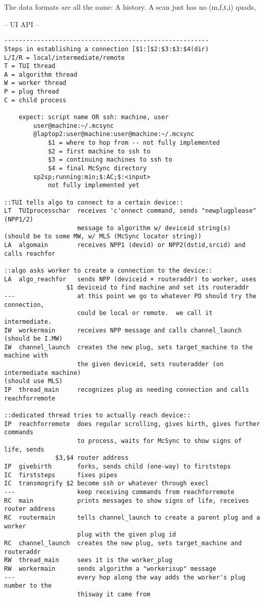 \documentclass{book}
\begin{document}
The data formats are all the same:  A history.  A scan just has no (m,f,t,i) quads,

-- UI API --

\begin{verbatim}
--------------------------------------------------------
Steps in establishing a connection [$1:]$2:$3:$3:$4(dir)
L/I/R = local/intermediate/remote
T = TUI thread
A = algorithm thread
W = worker thread
P = plug thread
C = child process

    expect: script name OR ssh: machine, user
        user@machine:~/.mcsync
        @laptop2:user@machine:user@machine:~/.mcsync
            $1 = where to hop from -- not fully implemented
            $2 = first machine to ssh to
            $3 = continuing machines to ssh to
            $4 = final McSync directory
        sp2sp;running:min;$:AC;$:<input>
            not fully implemented yet

::TUI tells algo to connect to a certain device::
LT  TUIprocesschar  receives 'c'onnect command, sends "newplugplease" (NPP1/2)
                    message to algorithm w/ deviceid string(s)
(should be to some MW, w/ MLS (McSync locator string))
LA  algomain        receives NPP1 (devid) or NPP2(dstid,srcid) and calls reachfor

::algo asks worker to create a connection to the device::
LA  algo_reachfor   sends NPP (deviceid + routeraddr) to worker, uses
                 $1 deviceid to find machine and set its routeraddr
---                 at this point we go to whatever PO should try the connection,
                    could be local or remote.  we call it intermediate.
IW  workermain      receives NPP message and calls channel_launch
(should be I.MW)
IW  channel_launch  creates the new plug, sets target_machine to the machine with
                    the given deviceid, sets routeradder (on intermediate machine)
(should use MLS)
IP  thread_main     recognizes plug as needing connection and calls reachforremote

::dedicated thread tries to actually reach device::
IP  reachforremote  does regular scrolling, gives birth, gives further commands
                    to process, waits for McSync to show signs of life, sends
              $3,$4 router address
IP  givebirth       forks, sends child (one-way) to firststeps
IC  firststeps      fixes pipes
IC  transmogrify $2 become ssh or whatever through execl
---                 keep receiving commands from reachforremote
RC  main            prints messages to show signs of life, receives router address
RC  routermain      tells channel_launch to create a parent plug and a worker
                    plug with the given plug id
RC  channel_launch  creates the new plug, sets target_machine and routeraddr
RW  thread_main     sees it is the worker_plug
RW  workermain      sends algorithm a "workerisup" message
---                 every hop along the way adds the worker's plug number to the
                    thisway it came from


\end{verbatim}
\end{document}
